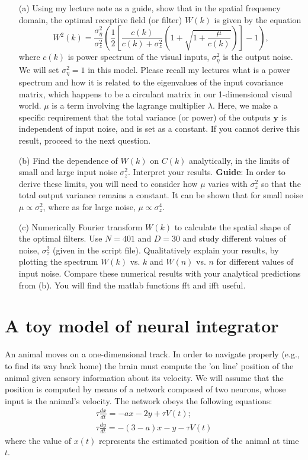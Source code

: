 \documentclass{article}
\begin{document}
\begin{enumerate}
\item[(a)] Using my lecture note as a guide, show that  in the spatial frequency domain, the optimal receptive field (or filter) $W(k)$ is given by the equation
\[
W^2(k) = \frac{\sigma_\eta^2}{\sigma_z^2}\left(\frac{1}{2}\left[\frac{c(k)}{c(k) + \sigma_z^2}\left(1+\sqrt{1+\frac{\mu}{c(k)}}\right)\right] - 1\right),
\]
where $c(k)$ is power spectrum of the visual inputs, $\sigma_\eta^2$ is the output noise. We will set $\sigma_\eta^2 = 1$ in this model. Please recall my lectures what is a power spectrum and how it is related to the eigenvalues of the input covariance matrix, which happens to be a circulant matrix in our 1-dimensional visual world. $\mu$ is a term involving the lagrange multiplier $\lambda$. Here, we make a specific requirement that the total variance (or power) of the outputs $\mathbf{y}$ is independent of input noise, and is set as a constant. If you cannot derive this result, proceed to the next question.

\item[(b)] Find the dependence of $W(k)$ on $C(k)$ analytically, in the limits of small and large input noise $\sigma_z^2$. Interpret your results.  \textbf{Guide}: In order to derive these limits, you will need to consider how $\mu$ varies with $\sigma_z^2$ so that the total output variance remains a constant. It can be shown that for small noise $\mu \propto \sigma_z^2$, where as for large noise,  $\mu \propto \sigma_z^4$.

\item[(c)] Numerically Fourier transform $W(k)$ to calculate the spatial shape of the optimal filters. Use $N=401$ and $D=30$ and study different values of noise, $\sigma_z^2$ (given in the script file). Qualitatively explain your results, by plotting the spectrum $W(k)$ vs. $k$ and $W(n)$ vs. $n$ for different values of input noise. Compare these numerical results with your analytical predictions from (b). You will find the matlab functions fft and ifft useful.  
\end{enumerate}


\section*{A toy model of neural integrator}
An animal moves on a one-dimensional track. In order to navigate properly (e.g., to find its way back home) the brain must compute the 'on line' position of the animal given sensory information about its velocity. We will assume that the position is computed by means of a network composed of two neurons, whose input is the animal's velocity. The network obeys the following equations:
\begin{equation}
\begin{aligned}
\tau \frac{dx}{dt}=-ax-2y+\tau V(t); \\
\tau \frac{dy}{dt}=-(3-a)x-y-\tau V(t)
\end{aligned}
\end{equation}
where the value of $x(t)$ represents the estimated position of the animal at time $t$. 
\end{document}
